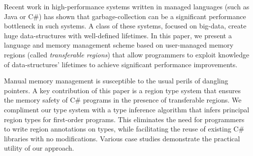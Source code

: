 Recent work in high-performance systems written in managed languages
(such as Java or C\#) has shown that garbage-collection can be a
significant performance bottleneck in such systems.  A class of these
systems, focused on big-data, create huge data-structures with
well-defined lifetimes.  In this paper, we present a language and
memory management scheme based on user-managed memory regions (called
\emph{transferable regions}) that allow programmers to exploit
knowledge of data-structures' lifetimes to achieve significant
performance improvements.

Manual memory management is susceptible to the usual perils of
dangling pointers.  A key contribution of this paper is a region type
system that ensures the memory safety of C\# programs in the presence
of transferable regions. We compliment our type system with a type
inference algorithm that infers principal region types for first-order
programs. This eliminates the need for programmers to write region
annotations on types, while facilitating the reuse of existing C\#
libraries with no modifications. Various case studies demonstrate the
practical utility of our approach.

